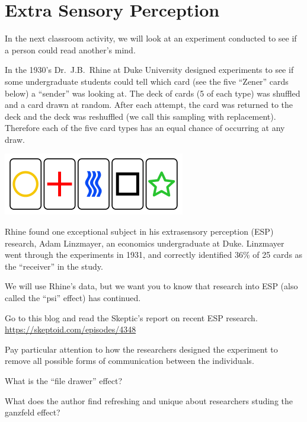 \def\theTopic{Reading 4}


\section { Extra Sensory Perception}


In the next classroom activity, we will look at an experiment conducted to see
if a person could read another's mind. 

 In the 1930's Dr.~J.B.~Rhine at Duke University designed experiments
to see if some undergraduate students could tell which card (see the
five ``Zener'' cards below) a ``sender'' was looking at. The deck of
cards (5 of each type) was shuffled and a card drawn at random. After
each attempt, the card was returned to the deck and the deck was
reshuffled (we call this sampling with replacement).  Therefore each
of the five card types has an equal chance of occurring at any draw.
\begin{center}
  \includegraphics[width=.5\linewidth]{../plots/Zener_cards.png}
\end{center}

 Rhine found one exceptional subject in his extrasensory perception
 (ESP) research, Adam Linzmayer, an economics undergraduate at Duke.
 Linzmayer went through the experiments in 1931, and correctly
 identified 36\% of 25 cards as the ``receiver'' in the study. 

We will use Rhine's data, but we want you to know that research into ESP
(also called the ``psi'' effect) has continued.

  Go to this blog and read the Skeptic's report on recent ESP
  research.\\
  \url{https://skeptoid.com/episodes/4348}\vspace{1cm}\label{skeptoid}


  Pay particular attention to how the researchers designed the
  experiment to remove all possible forms of communication between the
  individuals.  \vspace{1cm}


  What is the ``file drawer'' effect?\vspace{1cm}

  What does the author find refreshing and unique about researchers
  studing the ganzfeld effect?\vspace{1cm}



